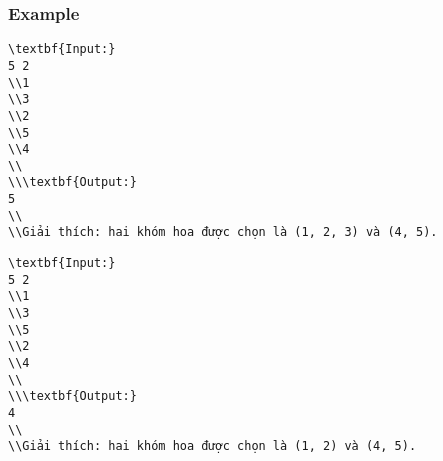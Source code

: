 \subsubsection{   Example  }
\begin{verbatim}
\textbf{Input:}
5 2
\\1 
\\3 
\\2 
\\5 
\\4
\\
\\\textbf{Output:}
5
\\
\\Giải thích: hai khóm hoa được chọn là (1, 2, 3) và (4, 5).\end{verbatim}
\begin{verbatim}
\textbf{Input:}
5 2
\\1 
\\3 
\\5 
\\2 
\\4
\\
\\\textbf{Output:}
4
\\
\\Giải thích: hai khóm hoa được chọn là (1, 2) và (4, 5).\end{verbatim}
